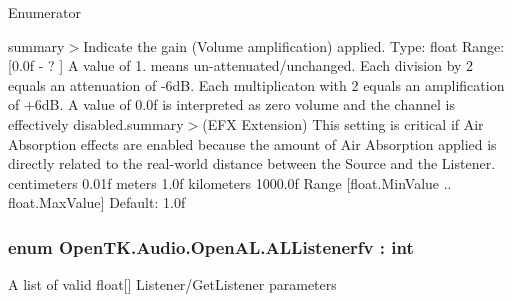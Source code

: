 \begin{Desc}
\item[Enumerator]\par
\begin{description}
\item[{\em 
\hypertarget{namespace_open_t_k_1_1_audio_1_1_open_a_l_a5bff3bb283f0f410f16305a3dcdb808ba35d72fa7d84f4ae67d705373d1d44b88}{Gain}\label{namespace_open_t_k_1_1_audio_1_1_open_a_l_a5bff3bb283f0f410f16305a3dcdb808ba35d72fa7d84f4ae67d705373d1d44b88}
}]summary$>$Indicate the gain (Volume amplification) applied. Type\-: float Range\-: \mbox{[}0.\-0f -\/ ? \mbox{]} A value of 1. means un-\/attenuated/unchanged. Each division by 2 equals an attenuation of -\/6d\-B. Each multiplicaton with 2 equals an amplification of +6d\-B. A value of 0.\-0f is interpreted as zero volume and the channel is effectively disabled.summary$>$(E\-F\-X Extension) This setting is critical if Air Absorption effects are enabled because the amount of Air Absorption applied is directly related to the real-\/world distance between the Source and the Listener. centimeters 0.\-01f meters 1.\-0f kilometers 1000.\-0f Range \mbox{[}float.\-Min\-Value .. float.\-Max\-Value\mbox{]} Default\-: 1.\-0f\end{description}
\end{Desc}
\hypertarget{namespace_open_t_k_1_1_audio_1_1_open_a_l_a3efa5ef6cd34b51a9c1bb311a40e9b12}{
\subsubsection[{A\-L\-Listenerfv}]{\setlength{\rightskip}{0pt plus 5cm}enum {\bf Open\-T\-K.\-Audio.\-Open\-A\-L.\-A\-L\-Listenerfv} \-: int}}\label{namespace_open_t_k_1_1_audio_1_1_open_a_l_a3efa5ef6cd34b51a9c1bb311a40e9b12}


A list of valid float\mbox{[}\mbox{]} Listener/\-Get\-Listener parameters

